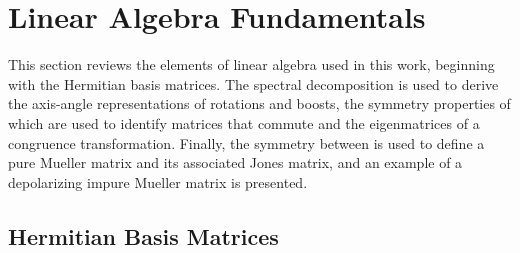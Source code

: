\section{Linear Algebra Fundamentals}
\label{app:linear_algebra}

This section reviews the elements of linear algebra used
in this work, beginning with the Hermitian basis matrices.
%
The spectral decomposition is used
to derive the axis-angle representations of rotations and boosts,
%
the symmetry properties of which are used to identify
matrices that commute and the eigenmatrices of a congruence transformation.
%
Finally, the symmetry between  is used to define a pure Mueller matrix and its associated Jones matrix, and an example of a depolarizing impure Mueller matrix is presented.


\subsection{Hermitian Basis Matrices}
\label{app:basis}

